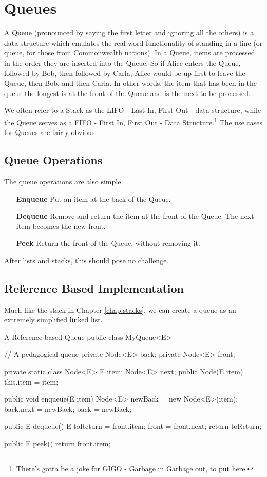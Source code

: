 
\chapter{Queues}
\label{chap-queue}

A Queue (pronounced by saying the first letter and ignoring all the others) is a data structure which emulates the real word functionality of standing in a line (or queue, for those from Commonwealth nations).  
In a Queue, items are processed in the order they are inserted into the Queue.  So if Alice enters the Queue, followed by Bob, then followed by Carla, Alice would be up first to leave the Queue, then Bob, and then Carla.
In other words, the item that has been in the queue the longest is at the front of the Queue and is the next to be processed.

We often refer to a Stack as the LIFO - Last In, First Out - data structure, while the Queue serves as a FIFO - First In, First Out - Data Structure.\footnote{There's gotta be a joke for GIGO - Garbage in Garbage out, to put here.}
The use cases for Queues are fairly obvious.

\section{Queue Operations}
The queue operations are also simple. 

\begin{enumerate}
	\item[\textbf{Enqueue}] Put an item at the back of the Queue.
	\item[\textbf{Dequeue}] Remove and return the item at the front of the Queue.  The next item becomes the new front.
	\item[\textbf{Peek}] Return the front of the Queue, without removing it.
\end{enumerate}


After lists and stacks, this should pose no challenge.
\section{Reference Based Implementation}

Much like the stack in Chapter \ref{chap:stacks}, we can create a queue as an extremely simplified linked list.       

\begin{javacode}{A Reference based Queue}
public class MyQueue<E> {
	// A pedagogical queue
	private Node<E> back;
	private Node<E> front;
	
	private static class Node<E>{
		E item;
		Node<E> next;
		public Node(E item) {
			this.item = item;
		}
	}
	
	public void enqueue(E item){
		Node<E> newBack =  new Node<E>(item);
		back.next = newBack;
		back =  newBack;
	}
	
	public E dequeue() {
		E toReturn =  front.item;
		front = front.next;
		return toReturn;
	}
	
	public E peek() {
		return front.item;
	}
}

\end{javacode}



